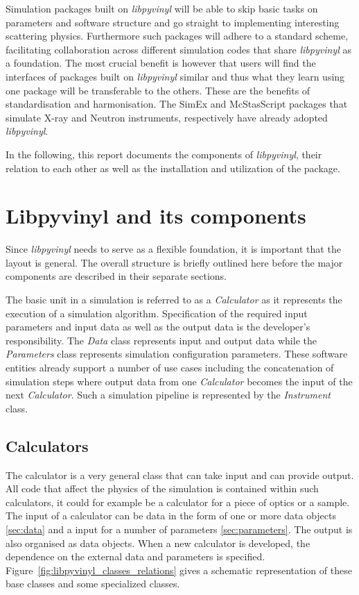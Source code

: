 \documentclass[10pt]{scrartcl}
\begin{document}
Simulation packages built on \textit{libpyvinyl} will be
able to skip basic tasks on parameters and software structure and go straight
to implementing interesting scattering physics. Furthermore such packages
will adhere to a standard scheme, facilitating collaboration across
different simulation codes that share \textit{libpyvinyl} as a foundation.
The most crucial benefit is
however that users will find the interfaces of packages built on
\textit{libpyvinyl} similar and thus what they learn using one package will be
transferable to the others. These are the benefits of standardisation and
harmonisation. The SimEx and McStasScript packages that simulate X-ray and
Neutron instruments, respectively have  already adopted \textit{libpyvinyl}.

In the following, this report documents the components of \textit{libpyvinyl}, their
relation to each other as well as the installation and utilization of the
package.

\section{Libpyvinyl and its components}
\label{sec:libpyvinyl}
Since \textit{libpyvinyl} needs to serve as a flexible foundation, it is
important that the layout is general. The overall structure is briefly outlined
here before the major components are described in their separate sections.

The basic unit in a simulation is referred to as a \textit{Calculator} as it
represents the execution of a simulation algorithm.
Specification of the required input parameters and input data as well as the
output data is the developer's responsibility. The \textit{Data} class
represents input and output data while the \textit{Parameters} class represents
simulation configuration parameters. These software entities already support a
number of use cases including the concatenation of simulation steps where output
data from one \textit{Calculator} becomes the input of the next
\textit{Calculator}.
Such a simulation pipeline is represented by the \textit{Instrument} class.

\subsection{Calculators}
\label{sec:calculators}
The calculator is a very general class that can take input and can provide
output. All code that affect the physics of the simulation is contained within
such calculators, it could for example be a calculator for a piece of optics or
a sample. The input of a calculator can be data in the form of one or more data
objects \ref{sec:data} and a input for a number of parameters
\ref{sec:parameters}. The output is also organised as data objects. When a new
calculator is developed, the dependence on the external data and parameters is
specified. Figure~\ref{fig:libpyvinyl_classes_relations} gives a schematic
representation of these base classes and some specialized classes. 
\end{document}
